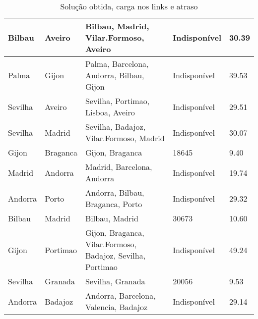\begin{table}[!htb]
{\begin{tabular}{|l|l|l|l|l|}
Bilbau & Aveiro & Bilbau, Madrid, Vilar.Formoso, Aveiro & Indisponível & 30.39 \\ \hline
Palma & Gijon & Palma, Barcelona, Andorra, Bilbau, Gijon & Indisponível & 39.53 \\ \hline
Sevilha & Aveiro & Sevilha, Portimao, Lisboa, Aveiro & Indisponível & 29.51 \\ \hline
Sevilha & Madrid & Sevilha, Badajoz, Vilar.Formoso, Madrid & Indisponível & 30.07 \\ \hline
Gijon & Braganca & Gijon, Braganca & 18645 & 9.40 \\ \hline
Madrid & Andorra & Madrid, Barcelona, Andorra & Indisponível & 19.74 \\ \hline
Andorra & Porto & Andorra, Bilbau, Braganca, Porto & Indisponível & 29.32 \\ \hline
Bilbau & Madrid & Bilbau, Madrid & 30673 & 10.60 \\ \hline
Gijon & Portimao & Gijon, Braganca, Vilar.Formoso, Badajoz, Sevilha, Portimao & Indisponível & 49.24 \\ \hline
Sevilha & Granada & Sevilha, Granada & 20056 & 9.53 \\ \hline
Andorra & Badajoz & Andorra, Barcelona, Valencia, Badajoz & Indisponível & 29.14 \\ \hline
\end{tabular}}
\caption[]{Solução obtida, carga nos links e atraso}
\end{table}

